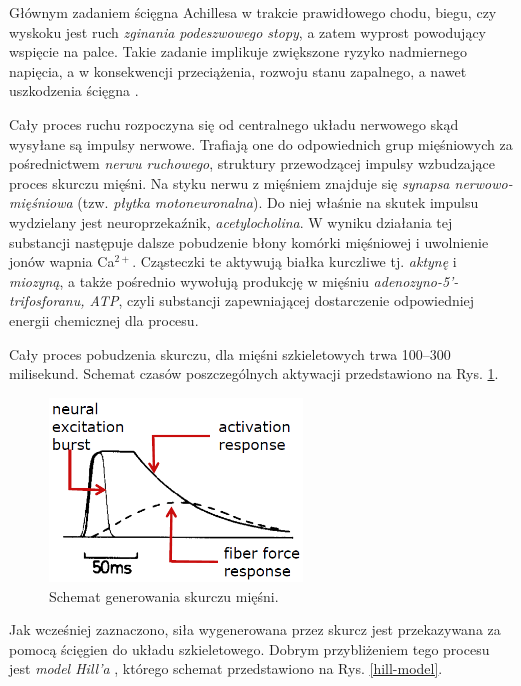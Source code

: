 Głównym zadaniem ścięgna Achillesa w trakcie prawidłowego chodu, biegu, czy wyskoku jest ruch \textit{zginania podeszwowego stopy}, a zatem wyprost powodujący wspięcie na palce. Takie zadanie implikuje zwiększone ryzyko nadmiernego napięcia, a w konsekwencji przeciążenia, rozwoju stanu zapalnego, a nawet uszkodzenia ścięgna \cite{Etiologia}.

Cały proces ruchu rozpoczyna się od centralnego układu nerwowego skąd wysyłane są impulsy nerwowe. Trafiają one do odpowiednich grup mięśniowych za pośrednictwem \textit{nerwu ruchowego}, struktury  przewodzącej impulsy wzbudzające proces skurczu mięśni. Na styku nerwu z mięśniem znajduje się \textit{synapsa nerwowo-mięśniowa} (tzw. \textit{płytka motoneuronalna}). Do niej właśnie na skutek impulsu wydzielany jest neuroprzekaźnik, \textit{acetylocholina}. W wyniku działania tej substancji następuje dalsze pobudzenie błony komórki mięśniowej i uwolnienie jonów wapnia Ca$^{2+}$. Cząsteczki te aktywują białka kurczliwe tj. \textit{aktynę} i \textit{miozyną}, a także pośrednio wywołują produkcję w mięśniu \textit{adenozyno-5'-trifosforanu, ATP}, czyli substancji zapewniającej dostarczenie odpowiedniej energii chemicznej dla procesu.

Cały proces pobudzenia skurczu, dla mięśni szkieletowych trwa 100--300 milisekund. Schemat czasów poszczególnych aktywacji przedstawiono na Rys. \ref{muscle-excitements}. 
\begin{figure}[h!]
	\centering
	\includegraphics[width=0.6\textwidth]{figures/skurcz_miesni.png}
	\caption{Schemat generowania skurczu mięśni.}
	\label{muscle-excitements}
\end{figure}

Jak wcześniej zaznaczono, siła wygenerowana przez skurcz jest przekazywana za pomocą ścięgien do układu szkieletowego. Dobrym przybliżeniem tego procesu jest \textit{model Hill'a} \cite{Hill1938}, którego schemat przedstawiono na Rys. \ref{hill-model}.

